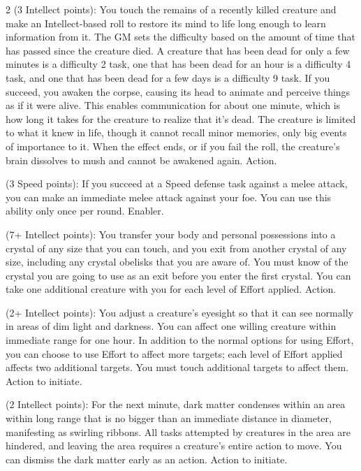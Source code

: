 \begin{multicols}{2}
 (3 Intellect points): You touch the remains of a recently killed creature and make an Intellect-based roll to restore its mind to life long enough to learn information from it. The GM sets the difficulty based on the amount of time that has passed since the creature died. A creature that has been dead for only a few minutes is a difficulty 2 task, one that has been dead for an hour is a difficulty 4 task, and one that has been dead for a few days is a difficulty 9 task. If you succeed, you awaken the corpse, causing its head to animate and perceive things as if it were alive. This enables communication for about one minute, which is how long it takes for the creature to realize that it’s dead. The creature is limited to what it knew in life, though it cannot recall minor memories, only big events of importance to it. When the effect ends, or if you fail the roll, the creature’s brain dissolves to mush and cannot be awakened again. Action. 
 
 (3 Speed points): If you succeed at a Speed defense task against a melee attack, you can make an immediate melee attack against your foe. You can use this ability only once per round. Enabler. 
 
 (7+ Intellect points): You transfer your body and personal possessions into a crystal of any size that you can touch, and you exit from another crystal of any size, including any crystal obelisks that you are aware of. You must know of the crystal you are going to use as an exit before you enter the first crystal. You can take one additional creature with you for each level of Effort applied. Action. 
 
 (2+ Intellect points): You adjust a creature’s eyesight so that it can see normally in areas of dim light and darkness. You can affect one willing creature within immediate range for one hour. In addition to the normal options for using Effort, you can choose to use Effort to affect more targets; each level of Effort applied affects two additional targets. You must touch additional targets to affect them. Action to initiate. 
 
 (2 Intellect points): For the next minute, dark matter condenses within an area within long range that is no bigger than an immediate distance in diameter, manifesting as swirling ribbons. All tasks attempted by creatures in the area are hindered, and leaving the area requires a creature’s entire action to move. You can dismiss the dark matter early as an action. Action to initiate. 
 

\end{multicols}
